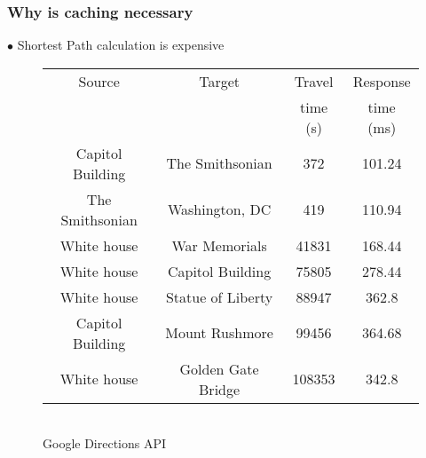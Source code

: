 \begin{frame}[red] %
\frametitle{Why is caching necessary}

$\bullet$ Shortest Path calculation is expensive

\begin{figure}[hbt]
  \center
  \scalebox{0.9} {
  \begin{tabular}{@{}c@{ }c@{ }c@{ }c@{}}\hline
   Source & Target & Travel & Response \\
          &    & time (s) & time (ms) \\
   \hline \hline
   Capitol Building & The Smithsonian & 372 & 101.24 \\\hline
   The Smithsonian & Washington, DC & 419 & 110.94 \\\hline
   White house & War Memorials & 41831 & 168.44 \\\hline
   White house & Capitol Building & 75805 & 278.44 \\\hline
   White house & Statue of Liberty & 88947 & 362.8 \\\hline
   Capitol Building & Mount Rushmore & 99456 & 364.68 \\\hline
   White house & Golden Gate Bridge & 108353 & 342.8 \\\hline
    \end{tabular}
    }\\
    \vspace{1em}Google Directions API
\end{figure}
\end{frame}




